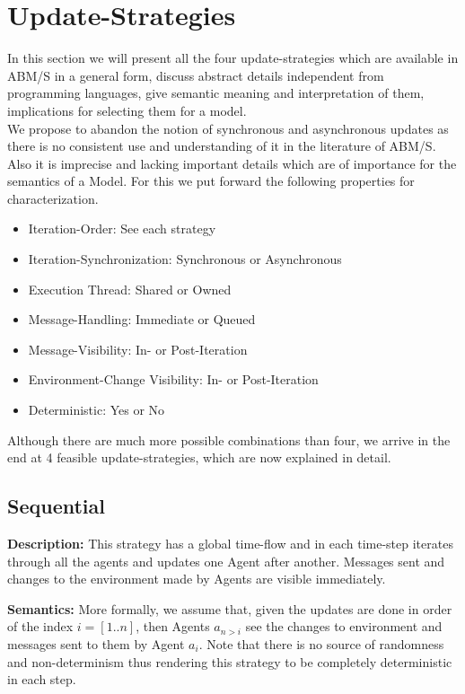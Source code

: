 \section{Update-Strategies}
In this section we will present all the four update-strategies which are available in ABM/S in a general form, discuss abstract details independent from programming languages, give semantic meaning and interpretation of them, implications for selecting them for a model. \\
We propose to abandon the notion of synchronous and asynchronous updates as there is no consistent use and understanding of it in the literature of ABM/S. Also it is imprecise and lacking important details which are of importance for the semantics of a Model. For this we put forward the following properties for characterization. 

\begin{itemize}
	\item Iteration-Order:				See each strategy
	\item Iteration-Synchronization: 	Synchronous or Asynchronous
	\item Execution Thread:				Shared or Owned
 	\item Message-Handling:				Immediate or Queued
 	\item Message-Visibility:			In- or Post-Iteration
 	\item Environment-Change Visibility:		In- or Post-Iteration
	\item Deterministic:				Yes or No
\end{itemize}

Although there are much more possible combinations than four, we arrive in the end at 4 feasible update-strategies, which are now explained in detail.

 	
\subsection{Sequential}
\textbf{Description:} This strategy has a global time-flow and in each time-step iterates through all the agents and updates one Agent after another. Messages sent and changes to the environment made by Agents are visible immediately. 

\textbf{Semantics:} More formally, we assume that, given the updates are done in order of the index $i = [1..n]$, then Agents $a_{n>i}$ see the changes to environment and messages sent to them by Agent $a_i$. Note that there is no source of randomness and non-determinism thus rendering this strategy to be completely deterministic in each step. 


